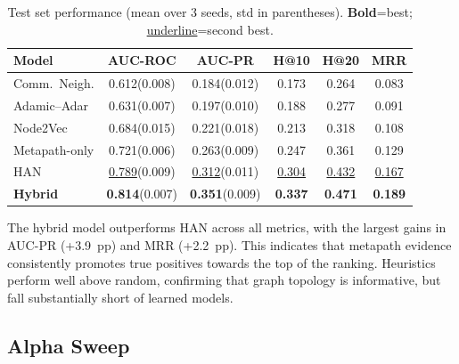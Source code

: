 \documentclass[10pt,a4paper,twocolumn]{article}
\begin{document}
\begin{table}[H]
\centering\scriptsize
\caption{Test set performance (mean over 3 seeds, std in parentheses).
\textbf{Bold}=best; \underline{underline}=second best.}
\label{tab:results}
\setlength{\tabcolsep}{2.5pt}
\begin{tabular}{lccccc}
\toprule
\textbf{Model} & \textbf{AUC-ROC} & \textbf{AUC-PR} & \textbf{H@10} & \textbf{H@20} & \textbf{MRR} \\
\midrule
Comm.\ Neigh.      & 0.612{\tiny(0.008)} & 0.184{\tiny(0.012)} & 0.173 & 0.264 & 0.083 \\
Adamic--Adar       & 0.631{\tiny(0.007)} & 0.197{\tiny(0.010)} & 0.188 & 0.277 & 0.091 \\
Node2Vec           & 0.684{\tiny(0.015)} & 0.221{\tiny(0.018)} & 0.213 & 0.318 & 0.108 \\
Metapath-only      & 0.721{\tiny(0.006)} & 0.263{\tiny(0.009)} & 0.247 & 0.361 & 0.129 \\
HAN                & \underline{0.789}{\tiny(0.009)} & \underline{0.312}{\tiny(0.011)} & \underline{0.304} & \underline{0.432} & \underline{0.167} \\
\textbf{Hybrid}    & \textbf{0.814}{\tiny(0.007)} & \textbf{0.351}{\tiny(0.009)} & \textbf{0.337} & \textbf{0.471} & \textbf{0.189} \\
\bottomrule
\end{tabular}
\end{table}

The hybrid model outperforms HAN across all metrics, with the largest gains in
AUC-PR (+3.9~pp) and MRR (+2.2~pp). This indicates that metapath evidence
consistently promotes true positives towards the top of the ranking. Heuristics
perform well above random, confirming that graph topology is informative, but
fall substantially short of learned models.

\subsection{Alpha Sweep}
\end{document}
